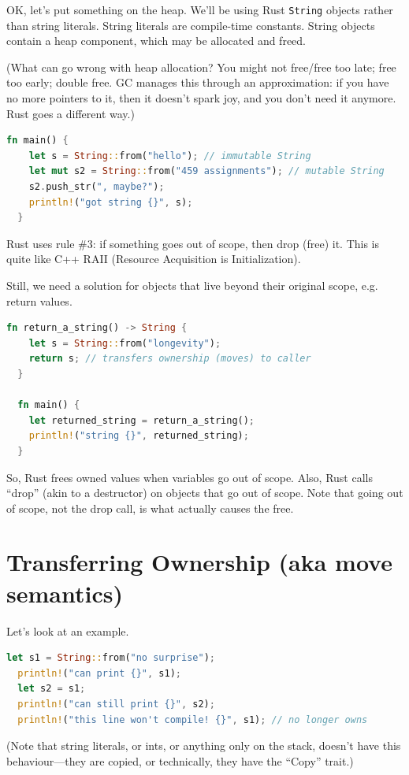 \documentclass[a4paper]{report}
\begin{document}
OK, let's put something on the heap. We'll be using Rust {\tt String} objects rather than
string literals. String literals are compile-time constants. String objects contain a heap component,
which may be allocated and freed.

(What can go wrong with heap allocation? You might not free/free too late;
free too early; double free. GC manages this through an approximation: if you have no more pointers to it,
then it doesn't spark joy, and you don't need it anymore. Rust goes a different way.)
\begin{lstlisting}[language=Rust]
  fn main() {
    let s = String::from("hello"); // immutable String
    let mut s2 = String::from("459 assignments"); // mutable String
    s2.push_str(", maybe?");
    println!("got string {}", s);
  }
\end{lstlisting}

Rust uses rule \#3: if something goes out of scope, then drop (free) it.
This is quite like C++ RAII (Resource Acquisition is Initialization).

Still, we need a solution for objects that live beyond their original scope, e.g.
return values.
\begin{lstlisting}[language=Rust]
  fn return_a_string() -> String {
    let s = String::from("longevity");
    return s; // transfers ownership (moves) to caller
  }

  fn main() {
    let returned_string = return_a_string();
    println!("string {}", returned_string);
  }
\end{lstlisting}

So, Rust frees owned values when variables go out of scope. Also, Rust calls
``drop'' (akin to a destructor) on objects that go out of scope. Note that
going out of scope, not the drop call, is what actually causes the free.

\section*{Transferring Ownership (aka move semantics)}

Let's look at an example.
\begin{lstlisting}[language=Rust]
  let s1 = String::from("no surprise");
  println!("can print {}", s1);
  let s2 = s1;
  println!("can still print {}", s2);
  println!("this line won't compile! {}", s1); // no longer owns
\end{lstlisting}

(Note that string literals, or ints, or anything only on the stack,
doesn't have this behaviour---they are copied, or technically, they
have the ``Copy'' trait.)
\end{document}
